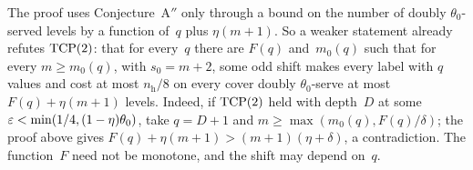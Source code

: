 The proof uses Conjecture~A$''$ only through a bound on the number of doubly $\theta_0$-served levels by a function
of~$q$ plus $\eta(m+1)$. So a weaker statement already refutes $\mathrm{TCP}(2)$: that for every~$q$ there are $F(q)$
and~$m_0(q)$ such that for every $m\ge m_0(q)$, with $s_0=m+2$, some odd shift makes every label with $q$ values and cost at
most $n_{\mathrm h}/8$ on every cover doubly $\theta_0$-serve at most $F(q)+\eta(m+1)$ levels. Indeed, if $\mathrm{TCP}(2)$ held with
depth~$D$ at some $\varepsilon<\min(1/4,(1-\eta)\theta_0)$, take $q=D+1$ and $m\ge\max(m_0(q),F(q)/\delta)$; the proof above gives
$F(q)+\eta(m+1)>(m+1)(\eta+\delta)$, a contradiction. The function~$F$ need not be monotone, and the shift may depend on~$q$.

